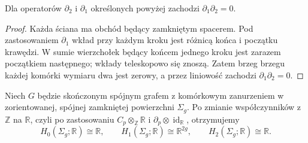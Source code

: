 \begin{stwierdzenie}
Dla operatorów $\partial_2$ i $\partial_1$ określonych
powyżej zachodzi $\partial_1\partial_2=0$.
\end{stwierdzenie}

\begin{proof}
Każda ściana ma obchód będący zamkniętym spacerem.
Pod zastosowaniem $\partial_1$ wkład przy każdym kroku
jest różnicą końca i początku krawędzi. W sumie
wierzchołek będący końcem jednego kroku jest zarazem
początkiem następnego; wkłady teleskopowo się znoszą.
Zatem brzeg brzegu każdej komórki wymiaru dwa jest zerowy,
a przez liniowość zachodzi $\partial_1\partial_2=0$.
\end{proof}

\begin{twierdzenie}
\label{thm:tg-surface-homology}
Niech $G$ będzie skończonym spójnym grafem z komórkowym
zanurzeniem w zorientowanej, spójnej zamkniętej powierzchni
$\Sigma_g$. Po zmianie współczynników z $\mathbb Z$ na $\mathbb R$,
czyli po zastosowaniu $C_p\otimes_{\mathbb Z}\mathbb R$
i $\partial_p\otimes\operatorname{id}_{\mathbb R}$,
otrzymujemy
\[
H_0(\Sigma_g;\mathbb R)\cong\mathbb R,
\qquad H_1(\Sigma_g;\mathbb R)\cong\mathbb R^{2g},
\qquad H_2(\Sigma_g;\mathbb R)\cong\mathbb R.
\]
\end{twierdzenie}

